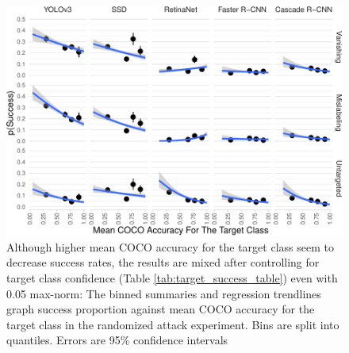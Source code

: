 \documentclass[
]{article}
\begin{document}
\begin{figure}[tb]

{\centering \includegraphics{imgs-normed/target_success_graph-1} 

}

\caption{Although higher mean COCO accuracy for the target class seem to decrease success rates, the results are mixed after controlling for target class confidence (Table \ref{tab:target_success_table}) even with 0.05 max-norm:  The binned summaries and regression trendlines graph success proportion against mean COCO accuracy for the target class in the randomized attack experiment. Bins are split into quantiles. Errors are 95\% confidence intervals}\label{fig:target_success_graph}
\end{figure}

\begingroup\fontsize{9}{11}\selectfont
\end{document}
